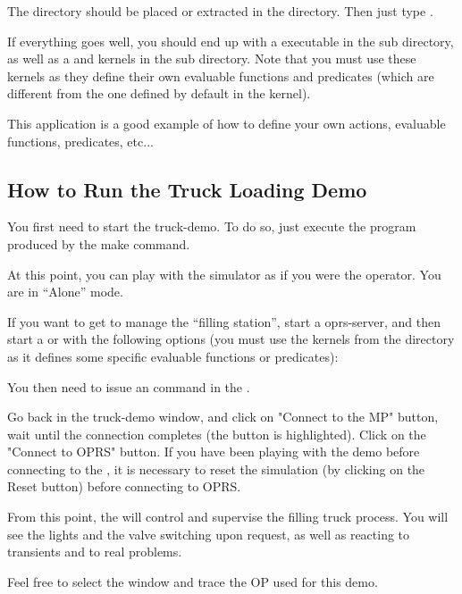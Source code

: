 The  directory should be placed or extracted in the 
directory. Then just type \*
.

If everything goes well, you should end up with a  executable
in the  sub directory, as well as a  and
 kernels in the  sub directory. Note that
you must use these kernels as they define their own evaluable functions and
predicates (which are different from the one defined by default in the kernel).

This application is a good example of how to define your own actions, evaluable
functions, predicates, etc...

\subsection{How to Run the Truck Loading Demo}

You first need to start the truck-demo. To do so, just execute the
 program produced by the make command.

At this point, you can play with the simulator as if you were the operator. You
are in ``Alone'' mode.

If you want to get \COPRS{} to manage the ``filling station'', start a oprs-server,
and then start a \CPK{} or \XPK{} with the following options (you must use the
kernels from the  directory as it defines some
specific evaluable functions or predicates): \*

You then need to issue an  command in the \OPRSS{}.

Go back in the truck-demo window, and click on "Connect to the MP" button, wait
until the connection completes (the button is highlighted). Click on the
"Connect to OPRS" button. If you have been playing with the demo before
connecting to the \CPK{}, it is necessary to reset the simulation (by clicking
on the Reset button) before connecting to OPRS.

From this point, the \CPK{} will control and supervise the filling truck
process. You will see the lights and the valve switching upon \OPRS{} request,
as well as \OPRS{} reacting to transients and to real problems.

Feel free to select the \XPK{} window and trace the OP used for this demo.

